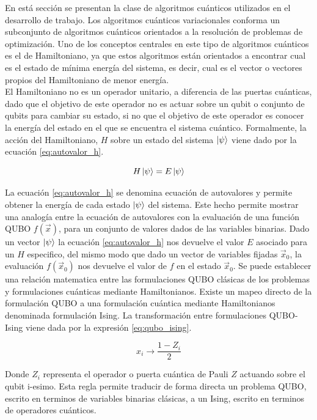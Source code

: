 En está sección se presentan la clase de algoritmos cuánticos utilizados en el desarrollo de trabajo. Los algoritmos cuánticos variacionales conforma un subconjunto de algoritmos cuánticos orientados a la resolución de problemas de optimización. Uno de los conceptos centrales en este tipo de algoritmos cuánticos es el de Hamiltoniano, ya que estos algoritmos están orientados a encontrar cual es el estado de mínima energía del sistema, es decir, cual es el vector o vectores propios del Hamiltoniano de menor energía. \\


El Hamiltoniano no es un operador unitario, a diferencia de las puertas cuánticas, dado que el objetivo de este operador no es actuar sobre un qubit o conjunto de qubits para cambiar su estado, si no que el objetivo de este operador es conocer la energía del estado en el que se encuentra el sistema cuántico. Formalmente, la acción del Hamiltoniano, $H$ sobre un estado del sistema $\ket{\psi}$ viene dado por la ecuación \ref{eq:autovalor_h}.

\begin{equation}
    H \ket{\psi} = E \ket{\psi}
    \label{eq:autovalor_h}
\end{equation}

La ecuación \ref{eq:autovalor_h} se denomina ecuación de autovalores y permite obtener la energía de cada estado $\ket{\psi}$ del sistema. Este hecho permite mostrar una analogía entre la ecuación de autovalores con la evaluación de una función QUBO $f(\Vec{x})$, para un conjunto de valores dados de las variables binarias. Dado un vector $\ket{\psi}$ la ecuación \ref{eq:autovalor_h} nos devuelve el valor $E$ asociado para un $H$ especifico, del mismo modo que dado un vector de variables fijadas $\Vec{x}_{0}$, la evaluación $f(\Vec{x}_0)$ nos devuelve el valor de $f$ en el estado $\Vec{x}_0$. Se puede establecer una relación matematica entre las formulaciones QUBO clásicas de los problemas y formulaciones cuánticas mediante Hamiltonianos. Existe un mapeo directo de la formulación QUBO a una formulación cuántica mediante Hamiltonianos denominada formulación Ising. La transformación entre formulaciones QUBO-Ising viene dada por la expresión \ref{eq:qubo_ising}.

\begin{equation}
    x_{i} \longrightarrow \frac{1 - Z_{i}}{2}
    \label{eq:qubo_ising}
\end{equation}

Donde $Z_{i}$ representa el operador o puerta cuántica de Pauli $Z$ actuando sobre el qubit i-esimo. Esta regla permite traducir de forma directa un problema QUBO, escrito en terminos de variables binarias clásicas, a un Ising, escrito en terminos de operadores cuánticos.\\

